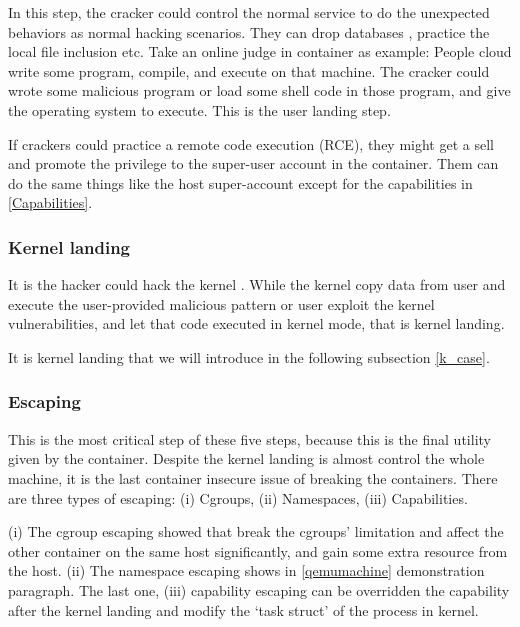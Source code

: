 In this step, the cracker could control the normal service to do the unexpected behaviors as
normal hacking scenarios. They can drop databases \cite{halfond2006classification} , practice
the local file inclusion \cite{hassan2018saisan, whitman2011principles} etc.
Take an online judge in container as example: People cloud write some program, compile, and execute on that
machine. The cracker could wrote some malicious program or load some shell code in those program,
and give the operating system to execute. This is the user landing step.

If crackers could practice a remote code execution (RCE), they might get a sell and promote the privilege to
the super-user account in the container. Them can do the same things like the host super-account except for
the capabilities in \ref{Capabilities}.

\subsubsection{Kernel landing}

It is the hacker could hack the kernel
\cite{gaspar2006root, dam2018automatic, jimenez2016vulnerability, 10.1007/978-1-4020-8739-4_86}.
While the kernel copy data from user and execute the user-provided malicious pattern
or user exploit the kernel vulnerabilities, and let that code executed in kernel mode, that is kernel landing.

It is kernel landing that we will introduce in the following subsection \ref{k_case}.

\subsubsection{Escaping}

This is the most critical step of these five steps, because this is the final utility given by the
container. Despite the kernel landing is almost control the whole machine, it is the last container
insecure issue of breaking the containers. There are three types of escaping: (\Rn{1}) Cgroups,
(\Rn{2}) Namespaces, (\Rn{3}) Capabilities.

(\Rn{1}) The cgroup escaping showed that \textcite{10.1145/3319535.3354227} break the
cgroups' limitation and affect the other container on the same host significantly, and gain
some extra resource from the host. (\Rn{2}) The namespace escaping shows in \ref{qemumachine}
demonstration paragraph.
The last one, (\Rn{3}) capability escaping can be overridden the capability after the kernel landing
and modify the `task struct' of the process in kernel.

